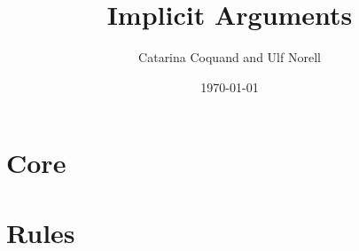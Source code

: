 \documentclass[11pt]{article}
\title{Implicit Arguments}
\author{Catarina Coquand and Ulf Norell}
\date{\today}
\begin{document}
\maketitle

\section{Core}


\section{Rules}

\end{document}
